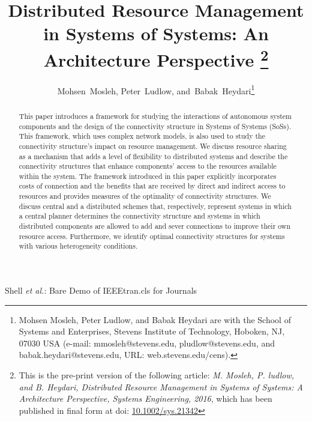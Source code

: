 \documentclass[journal,onecolumn]{IEEEtran}
\theoremstyle{plain}
\begin{document}
\doublespacing
\title{Distributed Resource Management in Systems of Systems: An Architecture Perspective \thanks{This is the pre-print version of the following article: \emph{M. Mosleh, P. ludlow, and B. Heydari, Distributed Resource Management in Systems of Systems: A Architecture Perspective, Systems Engineering, 2016}, which has been published in final form at 
doi: \href{http://doi.org/10.1002/sys.21342} {10.1002/sys.21342}      }}
\author{Mohsen~Mosleh,
        Peter~Ludlow,
        and~Babak~Heydari\thanks{ Mohsen Mosleh, Peter Ludlow, and Babak Heydari are with the School of Systems and Enterprises, Stevens Institute of Technology, Hoboken, NJ, 07030 USA (e-mail: mmosleh@stevens.edu, pludlow@stevens.edu, and babak.heydari@stevens.edu, URL: web.stevens.edu/cens).
}}















{Shell \MakeLowercase{\textit{et al.}}: Bare Demo of IEEEtran.cls for Journals}


\maketitle

\begin{abstract}
This paper introduces a framework for studying the interactions of autonomous system components and the design of the connectivity structure in Systems of Systems (SoSs). This framework, which uses complex network models, is also used to study the connectivity structure's impact on resource management. We discuss resource sharing as a mechanism that adds a level of flexibility to distributed systems and describe the connectivity structures that enhance components' access to the resources available within the system. The framework introduced in this paper explicitly incorporates costs of connection and the benefits that are received by direct and indirect access to resources and provides measures of the optimality of connectivity structures. We discuss central and a distributed schemes that, respectively, represent systems in which a central planner determines the connectivity structure and systems in which distributed components are allowed to add and sever connections to improve their own resource access. Furthermore, we identify optimal connectivity structures for systems with various heterogeneity conditions.

 
\end{abstract}
\end{document}
